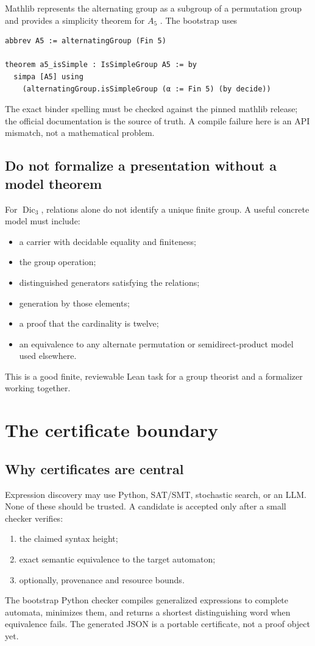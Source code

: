 \documentclass{amsart}
\begin{document}
Mathlib represents the alternating group as a subgroup of a permutation group and provides a simplicity theorem for $A_5$ \cite{mathlibAlternating2026}.  The bootstrap uses
\begin{lstlisting}[language={}]
abbrev A5 := alternatingGroup (Fin 5)

theorem a5_isSimple : IsSimpleGroup A5 := by
  simpa [A5] using
    (alternatingGroup.isSimpleGroup (α := Fin 5) (by decide))
\end{lstlisting}
The exact binder spelling must be checked against the pinned mathlib release; the official documentation is the source of truth.  A compile failure here is an API mismatch, not a mathematical problem.

\subsection{Do not formalize a presentation without a model theorem}

For $\operatorname{Dic}_3$, relations alone do not identify a unique finite group.  A useful concrete model must include:
\begin{itemize}
  \item a carrier with decidable equality and finiteness;
  \item the group operation;
  \item distinguished generators satisfying the relations;
  \item generation by those elements;
  \item a proof that the cardinality is twelve;
  \item an equivalence to any alternate permutation or semidirect-product model used elsewhere.
\end{itemize}
This is a good finite, reviewable Lean task for a group theorist and a formalizer working together.

\section{The certificate boundary}

\subsection{Why certificates are central}

Expression discovery may use Python, SAT/SMT, stochastic search, or an LLM.  None of these should be trusted.  A candidate is accepted only after a small checker verifies:
\begin{enumerate}
  \item the claimed syntax height;
  \item exact semantic equivalence to the target automaton;
  \item optionally, provenance and resource bounds.
\end{enumerate}
The bootstrap Python checker compiles generalized expressions to complete automata, minimizes them, and returns a shortest distinguishing word when equivalence fails.  The generated JSON is a portable certificate, not a proof object yet.
\end{document}
